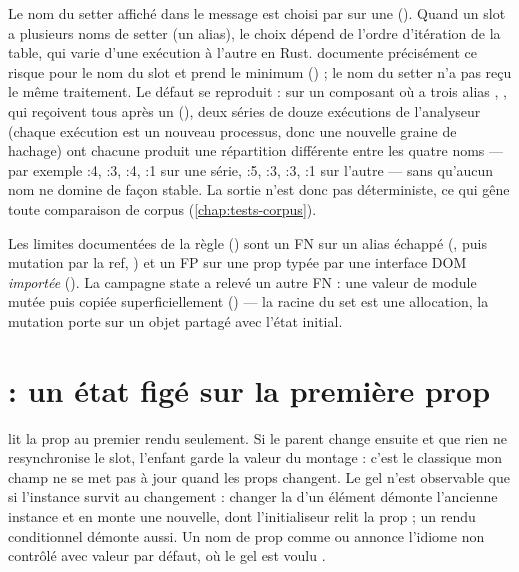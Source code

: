 \begin{remarque}
Le nom du setter affiché dans le message est choisi par  sur une  (). Quand un slot a plusieurs noms de setter (un alias), le choix dépend de l'ordre d'itération de la table, qui varie d'une exécution à l'autre en Rust.  documente précisément ce risque pour le nom du slot et prend le minimum () ; le nom du setter n'a pas reçu le même traitement. Le défaut se reproduit : sur un composant où  a trois alias , ,  qui reçoivent tous  après un  (), deux séries de douze exécutions de l'analyseur (chaque exécution est un nouveau processus, donc une nouvelle graine de hachage) ont chacune produit une répartition différente entre les quatre noms --- par exemple :4, :3, :4, :1 sur une série, :5, :3, :3, :1 sur l'autre --- sans qu'aucun nom ne domine de façon stable. La sortie n'est donc pas déterministe, ce qui gêne toute comparaison de corpus (\cref{chap:tests-corpus}).
\end{remarque}

Les limites documentées de la règle () sont un FN sur un alias échappé (, puis mutation par la ref, ) et un FP sur une prop typée par une interface DOM \emph{importée} (). La campagne \og state\fg{} a relevé un autre FN : une valeur de module mutée puis copiée superficiellement () --- la racine du set est une allocation, la mutation porte sur un objet partagé avec l'état initial.

\section{ : un état figé sur la première prop}
\label{sec:regles-etat-frozen}

\begin{react}
 lit la prop au premier rendu seulement. Si le parent change ensuite  et que rien ne resynchronise le slot, l'enfant garde la valeur du montage : c'est le classique \og mon champ ne se met pas à jour quand les props changent\fg. Le gel n'est observable que si l'instance survit au changement : changer la  d'un élément démonte l'ancienne instance et en monte une nouvelle, dont l'initialiseur relit la prop ; un rendu conditionnel démonte aussi. Un nom de prop comme  ou  annonce l'idiome \og non contrôlé avec valeur par défaut\fg, où le gel est voulu \cite{ReactDocs}.
\end{react}

